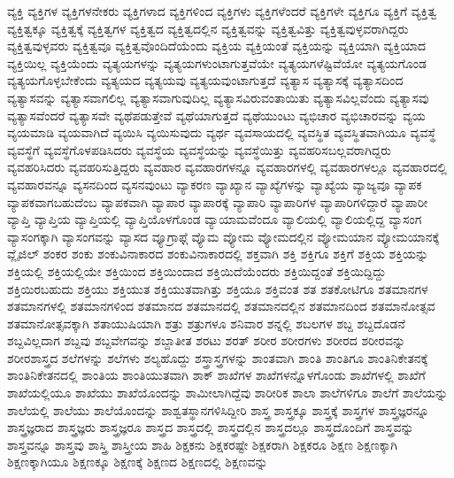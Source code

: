 {ವ್ಯಕ್ತಿ
ವ್ಯಕ್ತಿಗಳ
ವ್ಯಕ್ತಿಗಳನೇಕರು
ವ್ಯಕ್ತಿಗಳಾದ
ವ್ಯಕ್ತಿಗಳಿಂದ
ವ್ಯಕ್ತಿಗಳು
ವ್ಯಕ್ತಿಗಳೆಂದರೆ
ವ್ಯಕ್ತಿಗಳೇ
ವ್ಯಕ್ತಿಗೂ
ವ್ಯಕ್ತಿಗೆ
ವ್ಯಕ್ತಿತ್ವ
ವ್ಯಕ್ತಿತ್ವಕ್ಕೂ
ವ್ಯಕ್ತಿತ್ವಕ್ಕೆ
ವ್ಯಕ್ತಿತ್ವಗಳ
ವ್ಯಕ್ತಿತ್ವದ
ವ್ಯಕ್ತಿತ್ವದಲ್ಲಿನ
ವ್ಯಕ್ತಿತ್ವವನ್ನು
ವ್ಯಕ್ತಿತ್ವವಿತ್ತು
ವ್ಯಕ್ತಿತ್ವವುಳ್ಳವರಾಗಿದ್ದರು
ವ್ಯಕ್ತಿತ್ವವುಳ್ಳವರು
ವ್ಯಕ್ತಿತ್ವವೂ
ವ್ಯಕ್ತಿತ್ವವೊಂದಿದೆಯೆಂದು
ವ್ಯಕ್ತಿಯ
ವ್ಯಕ್ತಿಯಂತೆ
ವ್ಯಕ್ತಿಯನ್ನು
ವ್ಯಕ್ತಿಯಾಗಿ
ವ್ಯಕ್ತಿಯಾದ
ವ್ಯಕ್ತಿಯಿಲ್ಲ
ವ್ಯಕ್ತಿಯೆಂದು
ವ್ಯತ್ಯಯಗಳನ್ನು
ವ್ಯತ್ಯಯಗಳುಂಟಾಗುತ್ತವೆಯೇ
ವ್ಯತ್ಯಯಗಳೆಷ್ಟಿವೆಯೋ
ವ್ಯತ್ಯಯಗೊಂಡ
ವ್ಯತ್ಯಯಗೊಳ್ಳಬೇಕೆಂದು
ವ್ಯತ್ಯಯದ
ವ್ಯತ್ಯಯವು
ವ್ಯತ್ಯಯವುಂಟಾಗುತ್ತದೆ
ವ್ಯತ್ಯಾಸ
ವ್ಯತ್ಯಾಸಕ್ಕೆ
ವ್ಯತ್ಯಾಸದಿಂದ
ವ್ಯತ್ಯಾಸವನ್ನು
ವ್ಯತ್ಯಾಸವಾಗಲಿಲ್ಲ
ವ್ಯತ್ಯಾಸವಾಗುವುದಿಲ್ಲ
ವ್ಯತ್ಯಾಸವಿರುವಂತಾಯಿತು
ವ್ಯತ್ಯಾಸವಿಲ್ಲವೆಂದು
ವ್ಯತ್ಯಾಸವು
ವ್ಯತ್ಯಾಸವೆಂದರೆ
ವ್ಯತ್ಯಾಸವೇ
ವ್ಯಥೆಪಡುತ್ತೇವೆ
ವ್ಯಥೆಯಾಗುತ್ತದೆ
ವ್ಯಥೆಯುಂಟು
ವ್ಯಭಿಚಾರ
ವ್ಯಭಿಚಾರವನ್ನು
ವ್ಯಯ
ವ್ಯಯಮಾಡಿ
ವ್ಯಯವಾಗಿದೆ
ವ್ಯಯಿಸಿ
ವ್ಯಯಿಸುವುದು
ವ್ಯರ್ಥ
ವ್ಯವಸಾಯದಲ್ಲಿ
ವ್ಯವಸ್ಥಿತ
ವ್ಯವಸ್ಥಿತವಾಗಿಯೂ
ವ್ಯವಸ್ಥೆ
ವ್ಯವಸ್ಥೆಗೆ
ವ್ಯವಸ್ಥೆಗೊಳಪಡಿಸಿದರು
ವ್ಯವಸ್ಥೆಯ
ವ್ಯವಸ್ಥೆಯನ್ನು
ವ್ಯವಸ್ಥೆಯಿತ್ತು
ವ್ಯವಹರಿಸಬಲ್ಲವರಾಗಿದ್ದರು
ವ್ಯವಹರಿಸಿದರು
ವ್ಯವಹರಿಸುತ್ತಿದ್ದರು
ವ್ಯವಹಾರ
ವ್ಯವಹಾರಗಳನ್ನೂ
ವ್ಯವಹಾರಗಳಲ್ಲಿ
ವ್ಯವಹಾರಗಳಲ್ಲೂ
ವ್ಯವಹಾರದಲ್ಲಿ
ವ್ಯವಹಾರವನ್ನೂ
ವ್ಯಸನದಿಂದ
ವ್ಯಸನವುಂಟು
ವ್ಯಾಕರಣ
ವ್ಯಾಖ್ಯಾನ
ವ್ಯಾಖ್ಯೆಗಳನ್ನು
ವ್ಯಾಖ್ಯೆಯ
ವ್ಯಾಜ್ಯವೂ
ವ್ಯಾಪಕ
ವ್ಯಾಪಕವಾಗಬಹುದೆಂಬ
ವ್ಯಾಪಕವಾಗಿ
ವ್ಯಾಪಾರ
ವ್ಯಾಪಾರಕ್ಕೆ
ವ್ಯಾಪಾರಿ
ವ್ಯಾಪಾರಿಗಳ
ವ್ಯಾಪಾರಿಗಳಿದ್ದಾರೆ
ವ್ಯಾಪಾರೀ
ವ್ಯಾಪ್ತಿ
ವ್ಯಾಪ್ತಿಯ
ವ್ಯಾಪ್ತಿಯಲ್ಲಿ
ವ್ಯಾಪ್ತಿಯೊಳಗೊಂಡ
ವ್ಯಾಯಾಮವೆಂದೂ
ವ್ಯಾಲಿಯಲ್ಲಿ
ವ್ಯಾಲಿಯಲ್ಲಿದ್ದ
ವ್ಯಾಸಂಗ
ವ್ಯಾಸಂಗಕ್ಕಾಗಿ
ವ್ಯಾಸಂಗವನ್ನು
ವ್ಯಾಸದ
ವ್ಯೂಗ್ರಾಫ್ಗೆ
ವ್ಯೊಮ
ವ್ಯೋಮ
ವ್ಯೋಮದಲ್ಲಿನ
ವ್ಯೋಮಯಾನ
ವ್ಯೋಮಯಾನಕ್ಕೆ
ವ್ಲೈಜಿಲ್
ಶಂಕರ
ಶಂಕು
ಶಂಕುವಿನಾಕಾರದ
ಶಂಕುವಿನಾಕಾರದಲ್ಲಿ
ಶಕ್ತವಾಗಿ
ಶಕ್ತಿ
ಶಕ್ತಿಗೂ
ಶಕ್ತಿಗೆ
ಶಕ್ತಿಯ
ಶಕ್ತಿಯನ್ನು
ಶಕ್ತಿಯಲ್ಲಿ
ಶಕ್ತಿಯಲ್ಲಿಯೇ
ಶಕ್ತಿಯಿಂದ
ಶಕ್ತಿಯಿಂದಾದ
ಶಕ್ತಿಯಿದೆಯೆಂದರು
ಶಕ್ತಿಯಿದ್ದಂತೆ
ಶಕ್ತಿಯಿದ್ದಿದ್ದು
ಶಕ್ತಿಯಿರಬಹುದು
ಶಕ್ತಿಯು
ಶಕ್ತಿಯುತ
ಶಕ್ತಿಯುತವಾಗಿತ್ತು
ಶಕ್ತಿಯೂ
ಶಕ್ತಿವಂತ
ಶತ
ಶತಕೋಟಿಗೂ
ಶತಮಾನಗಳ
ಶತಮಾನಗಳಲ್ಲಿ
ಶತಮಾನಗಳಿಂದ
ಶತಮಾನದ
ಶತಮಾನದಲ್ಲಿ
ಶತಮಾನದಲ್ಲಿನ
ಶತಮಾನದಿಂದ
ಶತಮಾನೋತ್ಸವ
ಶತಮಾನೋತ್ಸವಕ್ಕಾಗಿ
ಶತಾಯುಷಿಯಾಗಿ
ಶತ್ರು
ಶತ್ರುಗಳೂ
ಶನಿವಾರ
ಶನ್ನಲ್ಲಿ
ಶಬಲಗಳ
ಶಬ್ದ
ಶಬ್ದದೊಡನೆ
ಶಬ್ದವಿಲ್ಲದಾಗ
ಶಬ್ದವು
ಶಬ್ದವೇಗವನ್ನು
ಶಬ್ದಾತೀತ
ಶರಟು
ಶರತ್
ಶರೀರ
ಶರೀರಗಳು
ಶರೀರದ
ಶರೀರವನ್ನು
ಶರೀರಶಾಸ್ತ್ರದ
ಶಲೆಗಳನ್ನು
ಶಲೆಗಳು
ಶಲ್ಯಹೊದ್ದು
ಶಸ್ತ್ರಾಸ್ತ್ರಗಳನ್ನು
ಶಾಂತವಾಗಿ
ಶಾಂತಿ
ಶಾಂತಿಗೂ
ಶಾಂತಿನಿಕೇತನಕ್ಕೆ
ಶಾಂತಿನಿಕೇತನದಲ್ಲಿ
ಶಾಂತಿಯ
ಶಾಂತಿಯುತವಾಗಿ
ಶಾಕ್
ಶಾಖೆಗಳ
ಶಾಖೆಗಳನ್ನೊಳಗೊಂಡು
ಶಾಖೆಗಳಲ್ಲಿ
ಶಾಖೆಗೆ
ಶಾಖೆಯಲ್ಲಿಯೂ
ಶಾಖೆಯು
ಶಾಖೆಯೊಂದನ್ನು
ಶಾಮೀಲಾಗಿದ್ದೆವು
ಶಾರೀರಿಕ
ಶಾಲಾ
ಶಾಲೆಗಳಿಗೂ
ಶಾಲೆಗೆ
ಶಾಲೆಯನ್ನು
ಶಾಲೆಯಲ್ಲಿ
ಶಾಲೆಯು
ಶಾಲೆಯೊಂದನ್ನು
ಶಾಶ್ವತಸ್ಥಾನಗಳಿಸಿದ್ದೀರಿ
ಶಾಸ್ತ್ರ
ಶಾಸ್ತ್ರಕ್ಕೂ
ಶಾಸ್ತ್ರಕ್ಕೆ
ಶಾಸ್ತ್ರಗಳ
ಶಾಸ್ತ್ರಜ್ಞರನ್ನೂ
ಶಾಸ್ತ್ರಜ್ಞರಾದ
ಶಾಸ್ತ್ರಜ್ಞರು
ಶಾಸ್ತ್ರಜ್ಞರೂ
ಶಾಸ್ತ್ರದ
ಶಾಸ್ತ್ರದಲ್ಲಿ
ಶಾಸ್ತ್ರದಲ್ಲಿನ
ಶಾಸ್ತ್ರದಲ್ಲೂ
ಶಾಸ್ತ್ರದೊಂದಿಗೆ
ಶಾಸ್ತ್ರವನ್ನು
ಶಾಸ್ತ್ರವನ್ನೂ
ಶಾಸ್ತ್ರವು
ಶಾಸ್ತ್ರಿ
ಶಾಸ್ತ್ರೀಯ
ಶಾಹಿ
ಶಿಕ್ಷಕನು
ಶಿಕ್ಷಕರಷ್ಟೇ
ಶಿಕ್ಷಕರಾಗಿ
ಶಿಕ್ಷಕರೂ
ಶಿಕ್ಷಣ
ಶಿಕ್ಷಣಕ್ಕಾಗಿ
ಶಿಕ್ಷಣಕ್ಕಾಗಿಯೂ
ಶಿಕ್ಷಣಕ್ಕೂ
ಶಿಕ್ಷಣಕ್ಕೆ
ಶಿಕ್ಷಣದ
ಶಿಕ್ಷಣದಲ್ಲಿ
ಶಿಕ್ಷಣವನ್ನು
}
